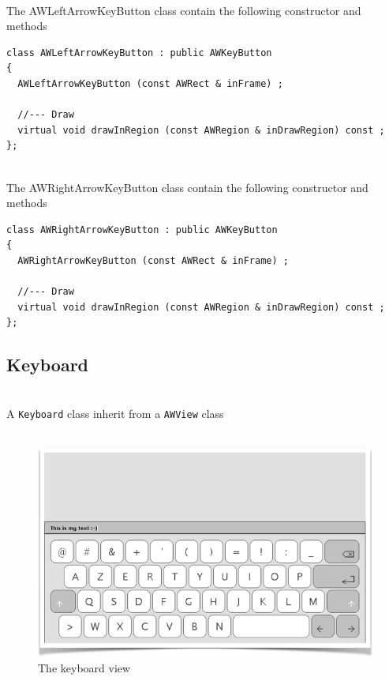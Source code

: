 \documentclass[a4paper,11pt]{extarticle}
\begin{document}
~\\ The AWLeftArrowKeyButton class contain the following constructor and methods

\begin{lstlisting}[language=Arduinonl]
class AWLeftArrowKeyButton : public AWKeyButton
{
  AWLeftArrowKeyButton (const AWRect & inFrame) ;
  
  //--- Draw
  virtual void drawInRegion (const AWRegion & inDrawRegion) const ;
};
\end{lstlisting}

~\\ The AWRightArrowKeyButton class contain the following constructor and methods

\begin{lstlisting}[language=Arduinonl]
class AWRightArrowKeyButton : public AWKeyButton
{
  AWRightArrowKeyButton (const AWRect & inFrame) ;
  
  //--- Draw
  virtual void drawInRegion (const AWRegion & inDrawRegion) const ;
};
\end{lstlisting}


\newpage
\subsection{Keyboard}

~\\ A \texttt{Keyboard} class inherit from a \texttt{AWView} class
~\\
~\\

\begin{figure}[htbp]
   \centering
   \includegraphics[scale=0.7]{AWFig18.png} 
   \caption{The keyboard view}
   \label{fig:18 }
\end{figure}
\end{document}
